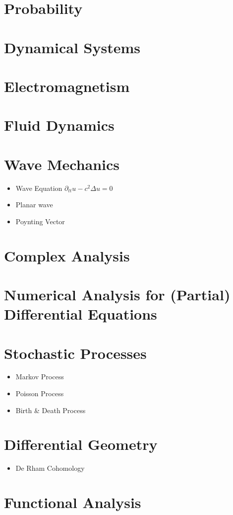 \documentclass[10pt]{article}
\begin{document}
\section{Probability}
\section{Dynamical Systems}
\section{Electromagnetism}
\section{Fluid Dynamics}
\section{Wave Mechanics}
	\begin{itemize}
	\item Wave Equation $\partial_{tt} u-c^2\Delta u=0$
	\item Planar wave
	\item Poynting Vector
	\end{itemize}
\section{Complex Analysis}
\section{Numerical Analysis for (Partial) Differential Equations}
\section{Stochastic Processes}
\begin{itemize}
	\item Markov Process
	\item Poisson Process
	\item Birth \& Death Process
\end{itemize}
\section{Differential Geometry}
\begin{itemize}
	\item De Rham Cohomology
\end{itemize}
\section{Functional Analysis}
\end{document}
